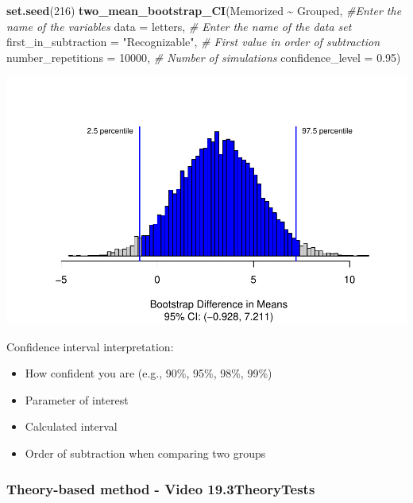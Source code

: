 \documentclass[
]{report}
\newenvironment{Shaded}{\begin{snugshade}}{\end{snugshade}}
\newcommand{\AttributeTok}[1]{\textcolor[rgb]{0.13,0.29,0.53}{#1}}
\newcommand{\CommentTok}[1]{\textcolor[rgb]{0.56,0.35,0.01}{\textit{#1}}}
\newcommand{\DecValTok}[1]{\textcolor[rgb]{0.00,0.00,0.81}{#1}}
\newcommand{\FloatTok}[1]{\textcolor[rgb]{0.00,0.00,0.81}{#1}}
\newcommand{\FunctionTok}[1]{\textcolor[rgb]{0.13,0.29,0.53}{\textbf{#1}}}
\newcommand{\NormalTok}[1]{#1}
\newcommand{\SpecialCharTok}[1]{\textcolor[rgb]{0.81,0.36,0.00}{\textbf{#1}}}
\newcommand{\StringTok}[1]{\textcolor[rgb]{0.31,0.60,0.02}{#1}}
\begin{document}
\begin{Shaded}
\begin{Highlighting}[]
\FunctionTok{set.seed}\NormalTok{(}\DecValTok{216}\NormalTok{)}
\FunctionTok{two\_mean\_bootstrap\_CI}\NormalTok{(Memorized }\SpecialCharTok{\textasciitilde{}}\NormalTok{ Grouped, }\CommentTok{\#Enter the name of the variables}
                      \AttributeTok{data =}\NormalTok{ letters,  }\CommentTok{\# Enter the name of the data set}
                      \AttributeTok{first\_in\_subtraction =} \StringTok{"Recognizable"}\NormalTok{, }\CommentTok{\# First value in order of subtraction}
                      \AttributeTok{number\_repetitions =} \DecValTok{10000}\NormalTok{,  }\CommentTok{\# Number of simulations}
                      \AttributeTok{confidence\_level =} \FloatTok{0.95}\NormalTok{)}
\end{Highlighting}
\end{Shaded}

\begin{center}\includegraphics[width=0.7\linewidth]{12-VN12-1ofeach_files/figure-latex/unnamed-chunk-4-1} \end{center}

Confidence interval interpretation:

\begin{itemize}
\item
  How confident you are (e.g., 90\%, 95\%, 98\%, 99\%)
\item
  Parameter of interest
\item
  Calculated interval
\item
  Order of subtraction when comparing two groups
\end{itemize}

\vspace{0.8in}

\subsubsection*{Theory-based method - Video 19.3TheoryTests}\label{theory-based-method---video-19.3theorytests}
\end{document}
